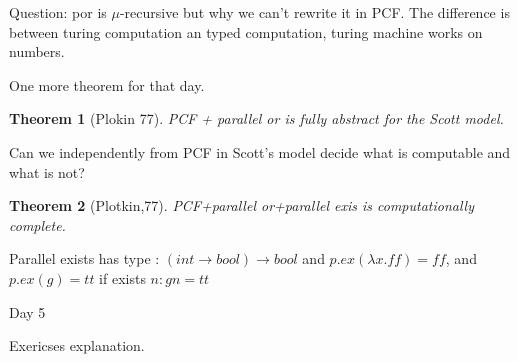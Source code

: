 \documentclass[a4paper,10pt]{book}
\newtheorem{theorem}{Theorem}
\newcommand{\rarr}{ \rightarrow }
\renewcommand{\tt}{ tt }
\newcommand{\ff}{ ff }
\begin{document}
Question: por is $\mu$-recursive but why we can't rewrite it in PCF. The difference is between 
turing computation an typed computation, turing machine works on numbers.

One more theorem for that day.

\begin{theorem}[Plokin 77]
 PCF + parallel or is fully abstract for the Scott model.
\end{theorem}
Can we independently from PCF in Scott's model decide what is computable and what is not?
\begin{theorem}[Plotkin,77]
 PCF+parallel or+parallel exis is computationally complete.
\end{theorem}
Parallel exists has type : $(int\rarr bool) \rarr bool$ and 
$p.ex (\lambda x . \ff) = \ff$, and
$p.ex (g) = \tt$ if exists $n: g n = \tt$


Day 5

Exericses explanation.
\end{document}
